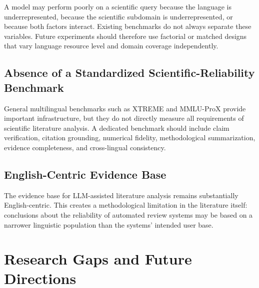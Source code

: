 \documentclass[acmsmall,screen,review]{acmart}
\begin{document}
A model may perform poorly on a scientific query because the language is underrepresented, because the scientific subdomain is underrepresented, or because both factors interact. Existing benchmarks do not always separate these variables. Future experiments should therefore use factorial or matched designs that vary language resource level and domain coverage independently.


\subsection{Absence of a Standardized Scientific-Reliability Benchmark}
\label{sec:metrics}

General multilingual benchmarks such as XTREME and MMLU-ProX provide important infrastructure, but they do not directly measure all requirements of scientific literature analysis. A dedicated benchmark should include claim verification, citation grounding, numerical fidelity, methodological summarization, evidence completeness, and cross-lingual consistency.


\subsection{English-Centric Evidence Base}
\label{sec:english-bias}

The evidence base for LLM-assisted literature analysis remains substantially English-centric. This creates a methodological limitation in the literature itself: conclusions about the reliability of automated review systems may be based on a narrower linguistic population than the systems' intended user base.


\section{Research Gaps and Future Directions}
\label{sec:gaps}

\end{document}
